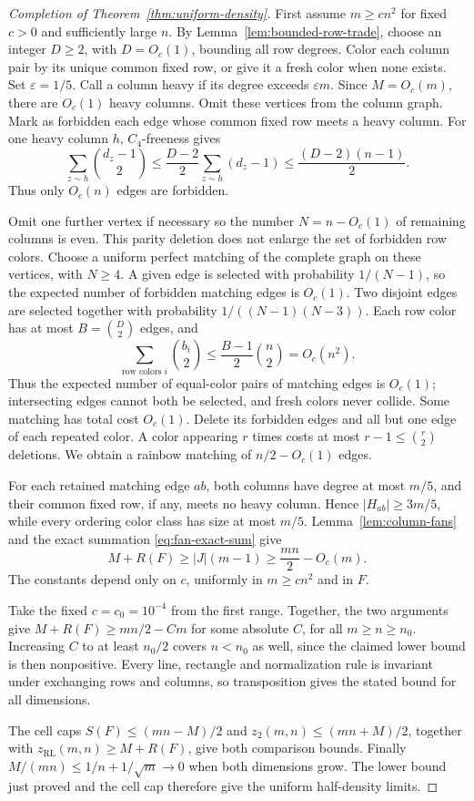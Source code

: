 \documentclass[11pt,a4paper]{article}
\theoremstyle{definition}
\newcommand{\zr}{z_{\mathrm{RL}}}
\newcommand{\zt}{z_2}
\begin{document}
\begin{proof}[Completion of Theorem~\ref{thm:uniform-density}]
First assume $m\ge cn^2$ for fixed $c>0$ and sufficiently large $n$.
By Lemma~\ref{lem:bounded-row-trade}, choose an integer $D\ge2$,
with $D=O_c(1)$, bounding all row degrees. Color each column pair by its unique common fixed row,
or give it a fresh color when none exists. Set $\varepsilon=1/5$. Call a column heavy if
its degree exceeds $\varepsilon m$. Since $M=O_c(m)$, there are
$O_c(1)$ heavy columns. Omit these vertices from the column graph.
Mark as forbidden each edge whose common fixed row meets a heavy column.
For one heavy column $h$, $C_4$-freeness gives
\[
 \sum_{z\sim h}\binom{d_z-1}{2}
 \le\frac{D-2}{2}\sum_{z\sim h}(d_z-1)
 \le\frac{(D-2)(n-1)}2.
\]
Thus only $O_c(n)$ edges are forbidden.

Omit one further vertex if necessary so the number $N=n-O_c(1)$
of remaining columns is even. This parity deletion does not enlarge the set
of forbidden row colors. Choose a uniform perfect matching of the complete
graph on these vertices, with $N\ge4$. A given edge is selected with
probability $1/(N-1)$, so the expected number of forbidden matching edges
is $O_c(1)$. Two disjoint edges are selected together with probability
$1/((N-1)(N-3))$. Each row color has at most $B=\binom D2$ edges, and
\[
 \sum_{\text{row colors }i}\binom{b_i}{2}
 \le\frac{B-1}{2}\binom n2=O_c(n^2).
\]
Thus the expected number of equal-color pairs of matching edges is $O_c(1)$;
intersecting edges cannot both be selected, and fresh colors never collide.
Some matching has total cost $O_c(1)$. Delete its forbidden edges
and all but one edge of each repeated color. A color appearing $r$ times
costs at most $r-1\le\binom r2$ deletions. We obtain a rainbow matching
of $n/2-O_c(1)$ edges.

For each retained matching edge $ab$, both columns have degree at most
$m/5$, and their common fixed row, if any, meets no heavy column.
Hence $|H_{ab}|\ge3m/5$, while every ordering color class has size at
most $m/5$. Lemma~\ref{lem:column-fans} and the exact summation
\eqref{eq:fan-exact-sum} give
\begin{equation}\label{eq:quadratic-error}
 M+R(F)\ge |J|(m-1)\ge\frac{mn}{2}-O_c(m).
\end{equation}
The constants depend only on $c$, uniformly in $m\ge cn^2$ and in $F$.

Take the fixed $c=c_0=10^{-4}$ from the first range. Together, the two
arguments give $M+R(F)\ge mn/2-Cm$ for some absolute $C$, for all
$m\ge n\ge n_0$. Increasing $C$ to at least $n_0/2$ covers $n<n_0$
as well, since the claimed lower bound is then nonpositive.
Every line, rectangle and normalization rule is invariant under exchanging
rows and columns, so transposition gives the stated bound for all dimensions.

The cell caps $S(F)\le(mn-M)/2$ and $\zt(m,n)\le(mn+M)/2$, together
with $\zr(m,n)\ge M+R(F)$, give both comparison bounds.
Finally $M/(mn)\le1/n+1/\sqrt m\to0$ when both dimensions grow.
The lower bound just proved and the cell cap therefore give the uniform
half-density limits.
\end{proof}
\end{document}
